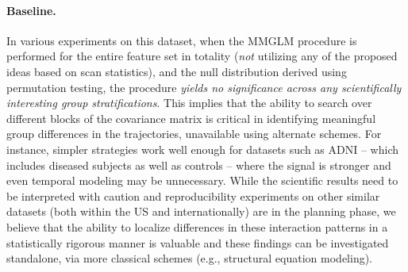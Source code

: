 \paragraph{Baseline.}
In various experiments on this dataset, when the MMGLM procedure is performed for the entire feature set in totality ({\em not} 
utilizing any of the proposed ideas based on scan statistics), 
and the null distribution derived using permutation testing, the procedure {\em yields no significance across \textit{any} 
scientifically interesting group stratifications}. 
This implies that the ability to search over different blocks of the covariance matrix is critical in identifying meaningful group differences 
in the trajectories, unavailable 
using alternate schemes. For instance, simpler strategies work well enough for datasets such as ADNI -- 
  which includes diseased subjects as well as controls -- 
  where the signal is stronger and even temporal modeling may be unnecessary.
  While the scientific results need to be interpreted with caution and reproducibility experiments on 
other similar datasets (both within the US and internationally) are in the planning phase, 
we believe that the ability to localize 
differences in these interaction patterns in a statistically rigorous manner is valuable and these findings can be investigated standalone, via 
more classical schemes (e.g., structural equation modeling). 


